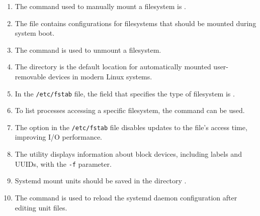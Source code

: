 \documentclass[a4paper]{report}
\begin{document}
\begin{enumerate}[1.]
    \item The command used to manually mount a filesystem is \underline{\hspace{2cm}}.
    
    \item The file \underline{\hspace{2cm}} contains configurations for filesystems that should be mounted during system boot.
    
    \item The \underline{\hspace{2cm}} command is used to unmount a filesystem.
    
    \item The \underline{\hspace{2cm}} directory is the default location for automatically mounted user-removable devices in modern Linux systems.
    
    \item In the \texttt{/etc/fstab} file, the field that specifies the type of filesystem is \underline{\hspace{2cm}}.
    
    \item To list processes accessing a specific filesystem, the command \underline{\hspace{2cm}} can be used.
    
    \item The \underline{\hspace{2cm}} option in the \texttt{/etc/fstab} file disables updates to the file's access time, improving I/O performance.
    
    \item The \underline{\hspace{2cm}} utility displays information about block devices, including labels and UUIDs, with the \texttt{-f} parameter.
    
    \item Systemd mount units should be saved in the directory \underline{\hspace{2cm}}.
    
    \item The command \underline{\hspace{2cm}} is used to reload the systemd daemon configuration after editing unit files.
    \end{enumerate}

\newpage
\end{document}
